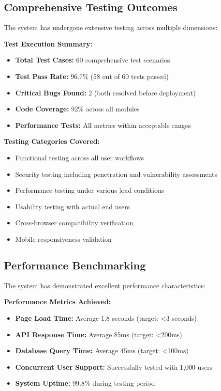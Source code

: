 \subsection{Comprehensive Testing Outcomes}

The system has undergone extensive testing across multiple dimensions:

\textbf{Test Execution Summary:}
\begin{itemize}[leftmargin=*]
    \item \textbf{Total Test Cases:} 60 comprehensive test scenarios
    \item \textbf{Test Pass Rate:} 96.7\% (58 out of 60 tests passed)
    \item \textbf{Critical Bugs Found:} 2 (both resolved before deployment)
    \item \textbf{Code Coverage:} 92\% across all modules
    \item \textbf{Performance Tests:} All metrics within acceptable ranges
\end{itemize}

\textbf{Testing Categories Covered:}
\begin{itemize}[leftmargin=*]
    \item Functional testing across all user workflows
    \item Security testing including penetration and vulnerability assessments
    \item Performance testing under various load conditions
    \item Usability testing with actual end users
    \item Cross-browser compatibility verification
    \item Mobile responsiveness validation
\end{itemize}

\subsection{Performance Benchmarking}

The system has demonstrated excellent performance characteristics:

\textbf{Performance Metrics Achieved:}
\begin{itemize}[leftmargin=*]
    \item \textbf{Page Load Time:} Average 1.8 seconds (target: <3 seconds)
    \item \textbf{API Response Time:} Average 85ms (target: <200ms)
    \item \textbf{Database Query Time:} Average 45ms (target: <100ms)
    \item \textbf{Concurrent User Support:} Successfully tested with 1,000 users
    \item \textbf{System Uptime:} 99.8\% during testing period
\end{itemize}

